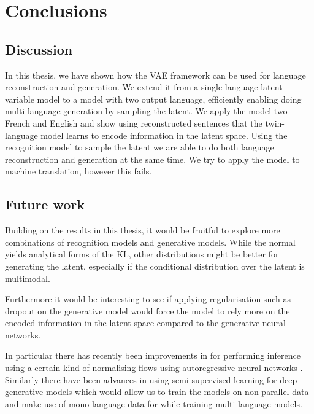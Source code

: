 \chapter{Conclusions}
\label{ConclusionsCh}

\section{Discussion}

In this thesis, we have shown how the VAE framework can be used for language
reconstruction and generation. We extend it from a single language latent
variable model to a model with two output language, efficiently enabling doing
multi-language generation by sampling the latent. We apply the model two French
and English and show using reconstructed sentences that the twin-language model
learns to encode information in the latent space. Using the recognition model to
sample the latent we are able to do both language reconstruction and generation
at the same time. We try to apply the model to machine translation, however
this fails.

\section{Future work}

Building on the results in this thesis, it would be fruitful to explore more
combinations of recognition models and generative models. While the normal
yields analytical forms of the KL, other distributions might be better for
generating the latent, especially if the conditional distribution over the
latent is multimodal.

Furthermore it would be interesting to see if applying regularisation such as
dropout on the generative model would force the model to rely more on the
encoded information in the latent space compared to the generative neural
networks.

In particular there has recently been improvements in for performing inference
using a certain kind of normalising flows using autoregressive neural networks
\cite{NIPS2016_6581}. Similarly there have been advances in using
semi-supervised learning \cite{NIPS2014_5352} for deep generative models which
would allow us to train the models on non-parallel data and make use of
mono-language data for while training multi-language models.


